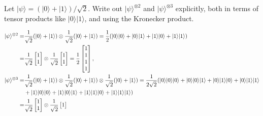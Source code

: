 \documentclass[en]{sol-man}
\begin{document}
\begin{exe}
    Let $\lvert\psi\rangle=(\lvert 0\rangle+\lvert 1\rangle)/\sqrt{2}$. Write out $\lvert\psi\rangle^{\otimes 2}$ and $\lvert\psi\rangle^{\otimes 3}$ explicitly, both in terms of tensor products like $\lvert 0\rangle\lvert 1\rangle$, and using the Kronecker product.
\end{exe}
\begin{sol}
    \begin{align}
        \lvert\psi\rangle^{\otimes 2}=&\frac{1}{\sqrt{2}}(\lvert 0\rangle+\lvert 1\rangle)\otimes\frac{1}{\sqrt{2}}(\lvert 0\rangle+\lvert 1\rangle)=\frac{1}{2}(\lvert 0\rangle\lvert 0\rangle+\lvert 0\rangle\lvert 1\rangle+\lvert 1\rangle\lvert 0\rangle+\lvert 1\rangle\lvert 1\rangle)\\
        =&\frac{1}{\sqrt{2}}\begin{bmatrix}
            1\\
            1
        \end{bmatrix}\otimes\frac{1}{\sqrt{2}}\begin{bmatrix}
            1\\
            1
        \end{bmatrix}=\frac{1}{2}\begin{bmatrix}
            1\\
            1\\
            1\\
            1
        \end{bmatrix},\\
        \notag\lvert\psi\rangle^{\otimes 3}=&\frac{1}{\sqrt{2}}(\lvert 0\rangle+\lvert 1\rangle)\otimes\frac{1}{\sqrt{2}}(\lvert 0\rangle+\lvert 1\rangle)\otimes\frac{1}{\sqrt{2}}(\lvert 0\rangle+\lvert 1\rangle)=\frac{1}{2\sqrt{2}}(\lvert 0\rangle\lvert 0\rangle\lvert 0\rangle+\lvert 0\rangle\lvert 0\rangle\lvert 1\rangle+\lvert 0\rangle\lvert 1\rangle\lvert 0\rangle+\lvert 0\rangle\lvert 1\rangle\lvert 1\rangle\\
        &+\lvert 1\rangle\lvert 0\rangle\lvert 0\rangle+\lvert 1\rangle\lvert 0\rangle\lvert 1\rangle+\lvert 1\rangle\lvert 1\rangle\lvert 0\rangle+\lvert 1\rangle\lvert 1\rangle\lvert 1\rangle)\\
        =&\frac{1}{\sqrt{2}}\begin{bmatrix}
            1\\
            1
        \end{bmatrix}\otimes\frac{1}{\sqrt{2}}\begin{bmatrix}
            1\\

\end{bmatrix}
\end{align}
\end{sol}
\end{document}
